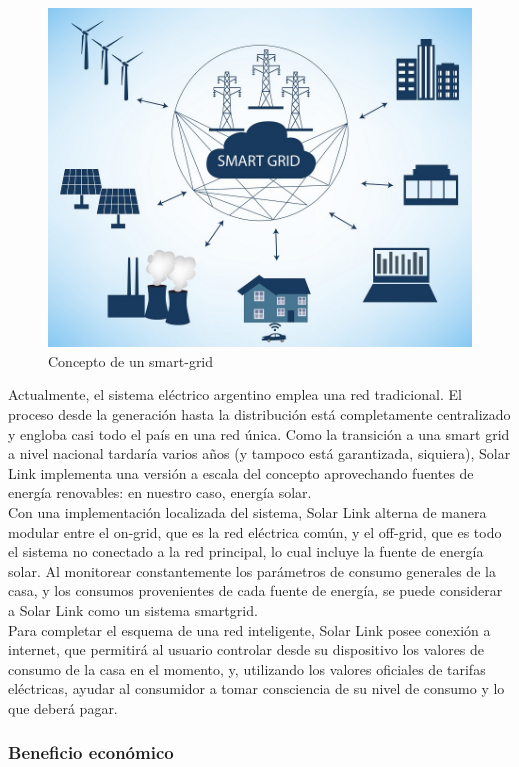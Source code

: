 \begin{figure}[H]
    \centering
    \includegraphics[width=0.75\linewidth]{Intro/smart-grid-2.jpg}
    \caption{Concepto de un smart-grid}
    
\end{figure}
Actualmente, el sistema eléctrico argentino emplea una red tradicional. El proceso desde la generación hasta la distribución está completamente centralizado y engloba casi todo el país en una red única. Como la transición a una smart grid a nivel nacional tardaría varios años (y tampoco está garantizada, siquiera), Solar Link implementa una versión a escala del concepto aprovechando fuentes de energía renovables: en nuestro caso, energía solar.\\

Con una implementación localizada del sistema, Solar Link alterna de manera modular entre el on-grid, que es la red eléctrica común, y el off-grid, que es todo el sistema no conectado a la red principal, lo cual incluye la fuente de energía solar. Al monitorear constantemente los parámetros de consumo generales de la casa, y los consumos provenientes de cada fuente de energía, se puede considerar a Solar Link como un sistema smartgrid.\\

Para completar el esquema de una red inteligente, Solar Link posee conexión a internet, que permitirá al usuario controlar desde su dispositivo los valores de consumo de la casa en el momento, y, utilizando los valores oficiales de tarifas eléctricas, ayudar al consumidor a tomar consciencia de su nivel de consumo y lo que deberá pagar. \\


\subsubsection{Beneficio económico}

